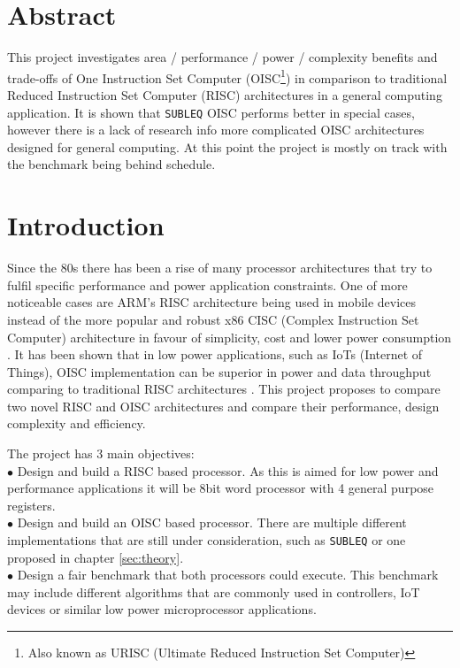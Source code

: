 \documentclass[a4paper,12pt]{article}
\begin{document}
\pagebreak

\begin{multicols}{2}

\section{Abstract}
This project investigates area / performance / power / complexity benefits and trade-offs of One Instruction Set Computer (OISC\footnote{Also known as URISC (Ultimate Reduced Instruction Set Computer)}) in comparison to traditional Reduced Instruction Set Computer (RISC) architectures in a general computing application. It is shown that \texttt{SUBLEQ} OISC performs better in special cases, however there is a lack of research info more complicated OISC architectures designed for general computing. At this point the project is mostly on track  with the benchmark being behind schedule.

\section{Introduction}
Since the 80s there has been a rise of many processor architectures that try to fulfil specific performance and power application constraints. One of more noticeable cases are ARM's RISC  architecture being used in mobile devices instead of the more popular and robust x86 CISC (Complex Instruction Set Computer) architecture in favour of simplicity, cost and lower power consumption \autocite{jamil_1995,blem_menon_sankaralingam_2013}. It has been shown that in low power applications, such as IoTs (Internet of Things), OISC implementation can be superior in power and data throughput comparing to traditional RISC architectures \autocite{yokota_saso_hara-azumi_2017, ahmed_sakamoto_anderson_hara-azumi_2015}. This project proposes to compare two novel RISC and OISC architectures and compare their performance, design complexity and efficiency.

The project has 3 main objectives:\\
$\bullet$ Design and build a RISC based processor. As this is aimed for low power and performance applications it will be 8bit word processor with 4 general purpose registers.\\
$\bullet$ Design and build an OISC based processor. There are multiple different implementations that are still under consideration, such as \texttt{SUBLEQ} or one proposed in chapter \ref{sec:theory}.\\
$\bullet$ Design a fair benchmark that both processors could execute. This benchmark may include different algorithms that are commonly used in controllers, IoT devices or similar low power microprocessor applications.


\end{multicols}
\end{document}
